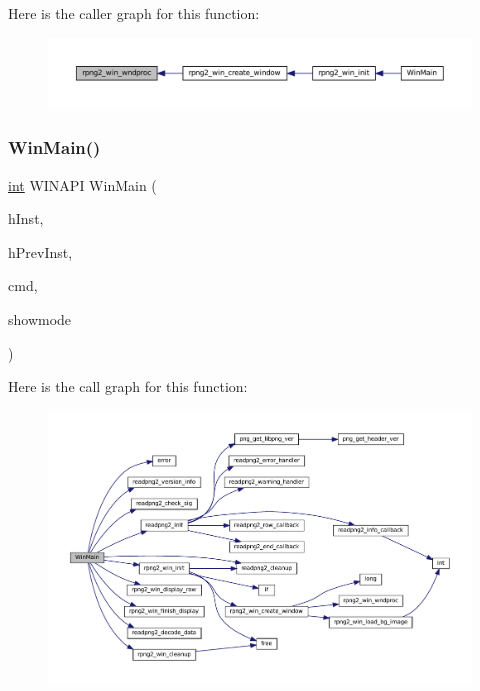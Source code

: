 Here is the caller graph for this function\+:
\nopagebreak
\begin{figure}[H]
\begin{center}
\leavevmode
\includegraphics[width=350pt]{rpng2-win_8c_af35a8c9c18f04bd6f13dc0add6c528e9_icgraph}
\end{center}
\end{figure}
\mbox{\label{rpng2-win_8c_a2db31d959abfda840605268cd8ba1d08}} 
\subsubsection{\texorpdfstring{Win\+Main()}{WinMain()}}
{\footnotesize\ttfamily \mbox{\hyperlink{ioapi_8h_a787fa3cf048117ba7123753c1e74fcd6}{int}} W\+I\+N\+A\+PI Win\+Main (\begin{DoxyParamCaption}\item[{H\+I\+N\+S\+T\+A\+N\+CE}]{h\+Inst,  }\item[{H\+I\+N\+S\+T\+A\+N\+CE}]{h\+Prev\+Inst,  }\item[{P\+S\+TR}]{cmd,  }\item[{\mbox{\hyperlink{ioapi_8h_a787fa3cf048117ba7123753c1e74fcd6}{int}}}]{showmode }\end{DoxyParamCaption})}

Here is the call graph for this function\+:
\nopagebreak
\begin{figure}[H]
\begin{center}
\leavevmode
\includegraphics[width=350pt]{rpng2-win_8c_a2db31d959abfda840605268cd8ba1d08_cgraph}
\end{center}
\end{figure}


